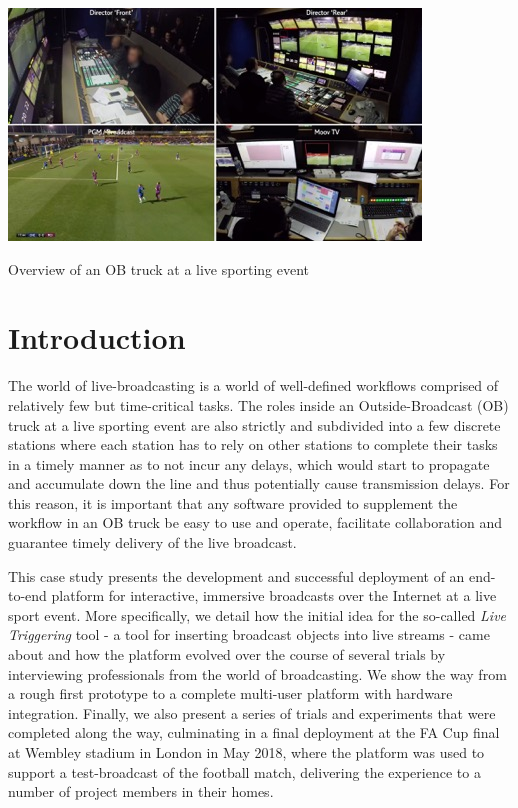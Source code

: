 \documentclass[sigchi-a, authorversion]{acmart}
\begin{document}
\begin{marginfigure}
    \vspace{15pc}
    \includegraphics[width=\marginparwidth]{Figures/overview.jpg}
    \caption{Overview of an OB truck at a live sporting event}
    \label{fig:overview}
\end{marginfigure}


\maketitle

\section{Introduction}

 The world of live-broadcasting is a world of well-defined workflows comprised
 of relatively few but time-critical tasks. The roles inside an Outside-Broadcast (OB)
 truck at a live sporting event are also strictly and subdivided into a few
 discrete stations where each station has to rely on other stations to complete
 their tasks in a timely manner as to  not incur any delays, which would start
 to propagate and accumulate down the line and thus potentially cause
 transmission delays. For this reason, it is important that any software
 provided to supplement the workflow in an OB truck be easy to use and operate,
 facilitate collaboration and guarantee timely delivery of the live broadcast.

 This case study presents the development and successful deployment of an
 end-to-end platform for interactive, immersive broadcasts over the Internet at
 a live sport event. More specifically, we detail how the initial idea for the
 so-called \emph{Live Triggering} tool - a tool for inserting broadcast objects
 into live streams - came about and how the platform evolved over the course of
 several trials by interviewing professionals from the world  of broadcasting.
 We show the way from a rough first prototype to a complete multi-user platform
 with hardware integration. Finally, we also present a series of trials and
 experiments that were completed along the way,  culminating in a final
 deployment at the FA Cup final at Wembley stadium in London in May 2018, where
 the platform was used to support a test-broadcast of the football match,
 delivering the experience to a number of project members in their homes.
\end{document}
